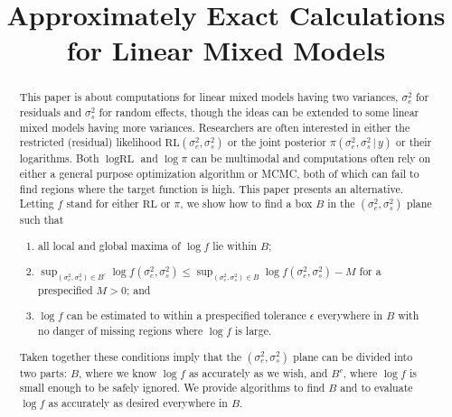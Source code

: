 \documentclass{report}
\newcommand{\RLorig}{\text{RL}}
\newcommand{\sigssq}{\sigma_s^2}
\newcommand{\sigesq}{\sigma_e^2}
\newcommand{\g}{\,|\,}
\begin{document}
\title{Approximately Exact Calculations for Linear Mixed Models}

\maketitle

\begin{abstract}
This paper is about computations for linear mixed models having two variances, $\sigma^2_e$ for residuals and $\sigma^2_s$ for random effects, though the ideas can be extended to some linear mixed models having more variances.  Researchers are often interested in either the restricted (residual) likelihood $\RLorig(\sigesq,\sigssq)$ or the joint posterior $\pi(\sigesq,\sigssq\g y)$ or their logarithms.  Both $\log\RLorig$ and $\log\pi$ can be multimodal and computations often rely on either a general purpose optimization algorithm or MCMC, both of which can fail to find regions where the target function is high.  This paper presents an alternative.  Letting $f$ stand for either $\RLorig$ or $\pi$, we show how to find a box $B$ in the $(\sigesq,\sigssq)$ plane such that
\begin{enumerate}
\item all local and global maxima of $\log f$ lie within $B$;
\item $\sup_{(\sigesq,\sigssq) \in B^c} \log f(\sigesq,\sigssq) \le \sup_{(\sigesq,\sigssq) \in B} \log f(\sigesq,\sigssq) - M$ for a prespecified $M>0$; and
\item $\log f$ can be estimated to within a prespecified tolerance $\epsilon$ everywhere in $B$ with no danger of missing regions where $\log f$ is large.
\end{enumerate}
Taken together these conditions imply that the $(\sigesq,\sigssq)$ plane can be divided into two parts: $B$, where we know $\log f$ as accurately as we wish,  and $B^c$, where $\log f$ is small enough to be safely ignored.  We provide algorithms to find $B$ and to evaluate $\log f$ as accurately as desired everywhere in $B$.
\end{abstract}
\end{document}
